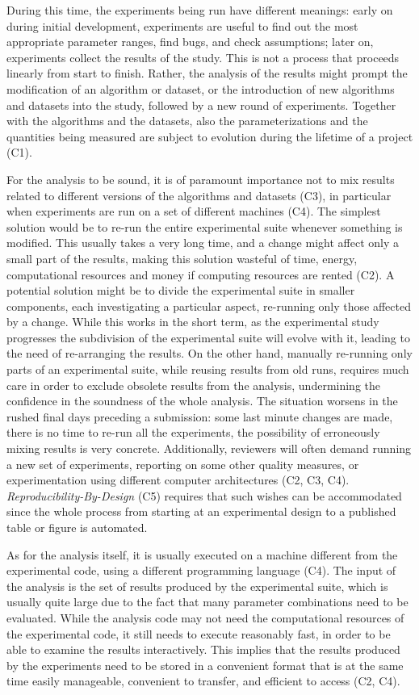 \documentclass{llncs}
\begin{document}
During this time, the experiments being run have different meanings: early
on during initial development, experiments are useful to find out the most
appropriate parameter ranges, find bugs, and check assumptions; later on,
experiments collect the results of the study.
This is not a process that proceeds linearly from start to finish. 
Rather, the analysis of the results might prompt the modification of an algorithm
or dataset, or the introduction of new algorithms and datasets into the study,
followed by a new round of experiments.
Together with the algorithms and the datasets, also the parameterizations and the
quantities being measured are subject to evolution during the lifetime of a project (C1).

For the analysis to be sound, it is of paramount importance not to 
mix results related to different versions
of the algorithms and datasets (C3), in particular when experiments are run on a set of different machines (C4). 
The simplest solution would be to re-run the entire experimental suite whenever
something is modified. 
This usually takes a very long time, and a change might affect 
only a small part of the results, making this solution wasteful of time, energy, computational resources and money if computing resources are rented (C2). 
A potential solution might be to divide the experimental suite in smaller
components, each investigating a particular aspect, re-running only those 
affected by a change.
While this works in the short term, as the experimental study progresses
the subdivision of the experimental suite will evolve with it, leading to the
need of re-arranging the results.
On the other hand, manually re-running only parts of an experimental suite,
while reusing results from old runs, requires much care in order to exclude
obsolete results from the analysis, undermining the confidence in the soundness
of the whole analysis.
The situation worsens in the rushed final days preceding a submission:
some last minute changes are made, there is no time to re-run all the experiments,
the possibility of erroneously mixing results is very concrete. Additionally, reviewers will often demand running a new set of experiments, reporting on some other quality measures, or experimentation using different computer architectures (C2, C3, C4). \emph{Reproducibility-By-Design} (C5) requires that such wishes can be accommodated since the whole process from starting at an experimental design to a published table or figure is automated.

As for the analysis itself, it is usually executed on a machine different from the
experimental code, using a different programming language (C4).
The input of the analysis is the set of results produced by the experimental suite,
which is usually quite large due to the fact that many parameter combinations
need to be evaluated.
While the analysis code may not need the computational resources of the 
experimental code, it still needs to execute reasonably fast, in order to be able
to examine the results interactively.
This implies that the results produced by the experiments need to be 
stored in a convenient
format that is at the same time easily manageable, convenient to transfer, and efficient to access (C2, C4).
\end{document}
